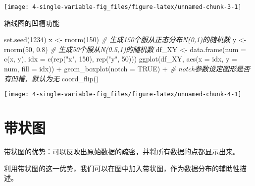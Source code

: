 \documentclass[
  lang=cn,
  11pt,
  scheme=chinese,
  chinesefont=nofont,
  citestyle=gb7714-2015,
  bibstyle=gb7714-2015]{elegantbook}
\newenvironment{Shaded}{\begin{snugshade}}{\end{snugshade}}
\newcommand{\AttributeTok}[1]{\textcolor[rgb]{0.77,0.63,0.00}{#1}}
\newcommand{\CommentTok}[1]{\textcolor[rgb]{0.56,0.35,0.01}{\textit{#1}}}
\newcommand{\ConstantTok}[1]{\textcolor[rgb]{0.00,0.00,0.00}{#1}}
\newcommand{\DecValTok}[1]{\textcolor[rgb]{0.00,0.00,0.81}{#1}}
\newcommand{\FloatTok}[1]{\textcolor[rgb]{0.00,0.00,0.81}{#1}}
\newcommand{\FunctionTok}[1]{\textcolor[rgb]{0.00,0.00,0.00}{#1}}
\newcommand{\NormalTok}[1]{#1}
\newcommand{\OtherTok}[1]{\textcolor[rgb]{0.56,0.35,0.01}{#1}}
\newcommand{\SpecialCharTok}[1]{\textcolor[rgb]{0.00,0.00,0.00}{#1}}
\newcommand{\StringTok}[1]{\textcolor[rgb]{0.31,0.60,0.02}{#1}}
\begin{document}
\begin{center}\texttt{[image: 4-single-variable-fig\_files/figure-latex/unnamed-chunk-3-1]} \end{center}

箱线图的凹槽功能

\begin{Shaded}
\begin{Highlighting}[]
\FunctionTok{set.seed}\NormalTok{(}\DecValTok{1234}\NormalTok{)}
\NormalTok{x }\OtherTok{\textless{}{-}} \FunctionTok{rnorm}\NormalTok{(}\DecValTok{150}\NormalTok{)  }\CommentTok{\# 生成150个服从正态分布N(0,1)的随机数}
\NormalTok{y }\OtherTok{\textless{}{-}} \FunctionTok{rnorm}\NormalTok{(}\DecValTok{50}\NormalTok{, }\FloatTok{0.8}\NormalTok{)  }\CommentTok{\# 生成50个服从N(0.5,1)的随机数}
\NormalTok{df\_XY }\OtherTok{\textless{}{-}} \FunctionTok{data.frame}\NormalTok{(}\AttributeTok{num =} \FunctionTok{c}\NormalTok{(x, y), }\AttributeTok{idx =} \FunctionTok{c}\NormalTok{(}\FunctionTok{rep}\NormalTok{(}\StringTok{"x"}\NormalTok{, }\DecValTok{150}\NormalTok{), }\FunctionTok{rep}\NormalTok{(}\StringTok{"y"}\NormalTok{, }\DecValTok{50}\NormalTok{)))}
\FunctionTok{ggplot}\NormalTok{(df\_XY, }\FunctionTok{aes}\NormalTok{(}\AttributeTok{x =}\NormalTok{ idx, }\AttributeTok{y =}\NormalTok{ num, }\AttributeTok{fill =}\NormalTok{ idx)) }\SpecialCharTok{+}
  \FunctionTok{geom\_boxplot}\NormalTok{(}\AttributeTok{notch =} \ConstantTok{TRUE}\NormalTok{) }\SpecialCharTok{+}  \CommentTok{\# notch参数设定图形是否有凹槽，默认为无}
  \FunctionTok{coord\_flip}\NormalTok{() }
\end{Highlighting}
\end{Shaded}

\begin{center}\texttt{[image: 4-single-variable-fig\_files/figure-latex/unnamed-chunk-4-1]} \end{center}

\hypertarget{sec:jitter}{%
\section{带状图}\label{sec:jitter}}

带状图的优势：可以反映出原始数据的疏密，并将所有数据的点都显示出来。

利用带状图的这一优势，我们可以在图中加入带状图，作为数据分布的辅助性描述。
\end{document}
